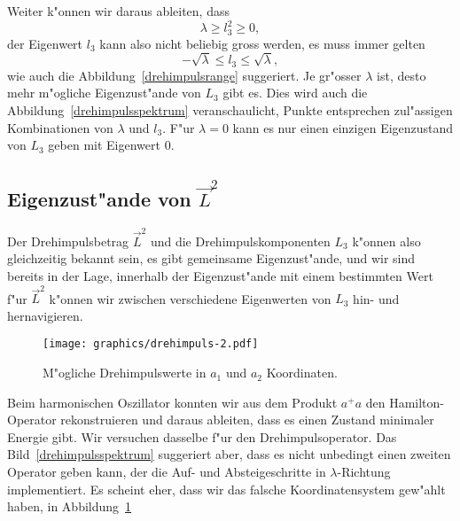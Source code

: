 Weiter k"onnen wir daraus ableiten, dass 
\[
\lambda\ge l_3^2\ge 0,
\]
der Eigenwert $l_3$ kann also nicht beliebig gross werden, es muss immer
gelten
\[
-\sqrt{\lambda}\le l_3\le \sqrt{\lambda},
\]
wie auch die Abbildung~\ref{drehimpulsrange} suggeriert.
Je gr"osser $\lambda$ ist, desto mehr m"ogliche Eigenzust"ande von $L_3$
gibt es.
Dies wird auch die Abbildung~\ref{drehimpulsspektrum} veranschaulicht,
Punkte entsprechen zul"assigen Kombinationen von $\lambda$ und $l_3$.
F"ur $\lambda=0$ kann es nur einen einzigen Eigenzustand von $L_3$ geben
mit Eigenwert $0$.

\subsection{Eigenzust"ande von $\vec L^2$}
Der Drehimpulsbetrag $\vec L^2$ und die Drehimpulskomponenten $L_3$ 
k"onnen also gleichzeitig bekannt sein, es gibt gemeinsame Eigenzust"ande,
und wir sind bereits in der Lage, innerhalb der Eigenzust"ande mit einem
bestimmten Wert f"ur $\vec L^2$ k"onnen wir zwischen verschiedene
Eigenwerten von $L_3$ hin- und hernavigieren.

\begin{figure}
\centering
\texttt{[image: graphics/drehimpuls-2.pdf]}
\caption{M"ogliche Drehimpulswerte in $a_1$ und $a_2$ Koordinaten.
\label{drehimpulsspektruma}}
\end{figure}
Beim harmonischen Oszillator konnten wir aus dem Produkt $a^+a$
den Hamilton-Operator rekonstruieren und daraus ableiten, dass es einen
Zustand minimaler Energie gibt.
Wir versuchen dasselbe f"ur den Drehimpulsoperator.
Das Bild~\ref{drehimpulsspektrum} suggeriert aber, dass es nicht
unbedingt einen zweiten Operator geben kann, der die
Auf- und Absteigeschritte in $\lambda$-Richtung implementiert.
Es scheint eher, dass wir das falsche Koordinatensystem gew"ahlt
haben, in Abbildung~\ref{drehimpulsspektruma}


